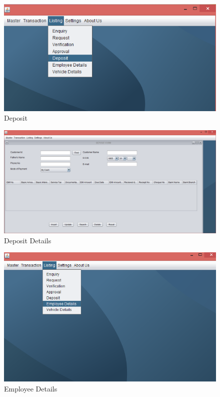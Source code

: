\begin{figure}[ht]
\begin{center}
\includegraphics[scale=0.5]{images/image40.png}
\end{center}
\caption{Deposit}
\label{Deposit}
\end{figure}

\begin{figure}[ht]
\begin{center}
\includegraphics[scale=0.5]{images/image41.png}
\end{center}
\caption{Deposit Details}
\label{Deposit Details}
\end{figure}

\begin{figure}[ht]
\begin{center}
\includegraphics[scale=0.5]{images/image42.png}
\end{center}
\caption{Employee Details}
\label{Employee Details}
\end{figure}


